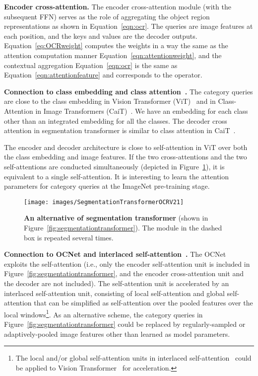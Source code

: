 \documentclass[runningheads]{llncs}
\begin{document}
{\vspace{0.1cm}
\noindent\textbf{Encoder cross-attention.}
The encoder cross-attention module (with the subsequent FFN) serves as the role 
of aggregating the object region representations
as shown in Equation~\ref{eqn:ocr}.
The queries are image features at each position,
and the keys and values are the decoder outputs. 
Equation~\ref{eq:OCRweight}
computes the weights
in a way the same as
the attention computation manner Equation~\ref{eqn:attentionweight},
and the contextual aggregation Equation~\ref{eqn:ocr}
is the same as Equation~\ref{eqn:attentionfeature}
and  corresponds to the  operator.


\vspace{0.1cm}
\noindent\textbf{Connection to class embedding and class attention~\cite{DosovitskiyBKWZUDMHGUH20,TouvronCSSJ21}.}
The category queries
are close to the class embedding 
in Vision Transformer (ViT)~\cite{DosovitskiyBKWZUDMHGUH20} and in Class-Attention in Image Transformers (CaiT)~\cite{TouvronCSSJ21}.
We have an embedding for each class
other than an integrated embedding for all the classes.
The decoder cross attention in segmentation transformer is similar to class attention 
in CaiT~\cite{TouvronCSSJ21}.


The encoder and decoder architecture
is close to self-attention in ViT
over both the class embedding and image features.
If the two cross-attentions and the two self-attentions are conducted simultaneously
(depicted in Figure~\ref{fig:segmentationtransformerv2}),
it is equivalent to a single self-attention. 
It is interesting 
to learn the attention parameters for category queries
at the ImageNet pre-training stage.

\begin{figure}
    \centering
    \texttt{[image: images/SegmentationTransformerOCRV21]}
    \caption{\small\textbf{An alternative of
    segmentation transformer} (shown in Figure~\ref{fig:segmentationtransformer}).
    The module in the dashed box is repeated several times.}
    \label{fig:segmentationtransformerv2}
\end{figure}

\vspace{0.1cm}
\noindent\textbf{Connection to OCNet and interlaced self-attention~\cite{yuan2021}.}
The OCNet~\cite{yuan2021} exploits the self-attention 
(i.e., only the encoder self-attention unit is included in Figure~\ref{fig:segmentationtransformer},
and the encoder cross-attention unit and the decoder are not included).
The self-attention unit is accelerated by
an interlaced self-attention unit,
consisting of local self-attention and global self-attention
that can be simplified as self-attention over the pooled features over
the local windows\footnote{The local and/or global self-attention units in interlaced self-attention~\cite{yuan2021}
could be applied to Vision Transformer~\cite{2020vit}
for acceleration.}.
As an alternative scheme,
the category queries in Figure~\ref{fig:segmentationtransformer}
could be replaced 
by regularly-sampled or adaptively-pooled image features
other than learned as model parameters.

}
\end{document}
